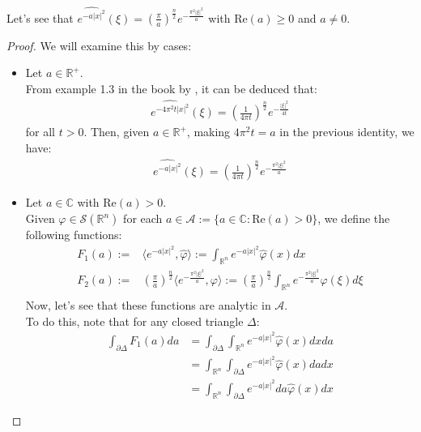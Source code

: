 \begin{example}{}
  Let’s see that $\hat{e^{-a|x|^2}}(\xi)=\left(\frac{\pi}{a}\right)^{\frac{n}{2}}e^{-\frac{\pi^2|\xi|^2}{a}}$ with $\text{Re}(a)\geq 0$ and $a\neq 0$.
\end{example}
\begin{proof}{}
  We will examine this by cases:
  \begin{itemize}
    \item Let $a\in\mathbb{R}^{+}$.\\
      From example 1.3 in the book by \cite{MR3308874}, it can be deduced that:
      \begin{align*}
        \hat{e^{-4\pi^2 t|x|^2}}(\xi)=\left(\frac{1}{4\pi t}\right)^{\frac{n}{2}}e^{-\frac{|\xi|^2}{4t}}
      \end{align*}
      for all $t>0$. Then, given $a\in\mathbb{R}^{+}$, making $4\pi^2 t=a$ in the previous identity, we have:
      \begin{align*}
        \hat{e^{-a|x|^2}}(\xi)=\left(\frac{1}{4\pi t}\right)^{\frac{n}{2}}e^{-\frac{\pi^2|\xi|^2}{a}}
      \end{align*}
    \item Let $a\in\mathbb{C}$ with $\text{Re}(a)>0$.\\
      Given $\varphi\in\mathcal{S}(\mathbb{R}^n)$ for each $a\in\mathcal{A}:=\{a\in\mathbb{C}:\text{Re}(a)>0\}$, we define the following functions:
      \begin{align*}
        F_1(a):=&\langle e^{-a|x|^2},\hat{\varphi}\rangle:=\int_{\mathbb{R}^n}e^{-a|x|^2}\hat{\varphi}(x)dx\\
        F_2(a):=&\left(\frac{\pi}{a}\right)^{\frac{n}{2}}\langle e^{-\frac{\pi^2|\xi|^2}{a}},\varphi\rangle:=\left(\frac{\pi}{a}\right)^{\frac{n}{2}}\int_{\mathbb{R}^n}e^{-\frac{\pi^2|\xi|^2}{a}}\varphi(\xi) d\xi\\
      \end{align*}
      Now, let’s see that these functions are analytic in $\mathcal{A}$.\\
      To do this, note that for any closed triangle $\Delta$:
      \begin{align*}
        \int_{\partial \Delta}F_1(a)da&=\int_{\partial \Delta}\int_{\mathbb{R}^n}e^{-a|x|^2}\hat{\varphi}(x)dxda\\
        &=\int_{\mathbb{R}^n}\int_{\partial \Delta}e^{-a|x|^2}\hat{\varphi}(x)dadx\\
        &=\int_{\mathbb{R}^n}\int_{\partial\Delta}e^{-a|x|^2}da\hat{\varphi}(x)dx
      \end{align*}

\end{itemize}
\end{proof}
